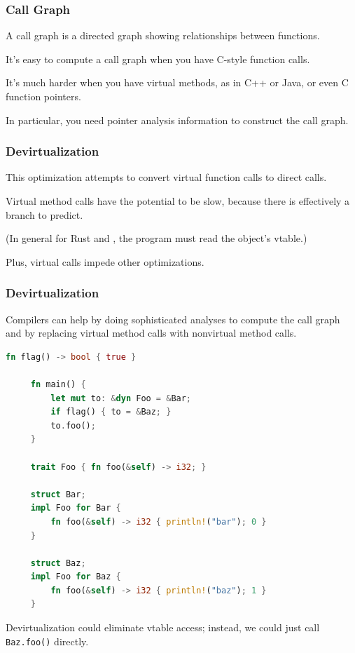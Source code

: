 \begin{frame}
\frametitle{Call Graph}


A \alert{call graph} is a directed graph showing relationships between
functions. 

It's easy to compute a call graph when you have C-style
function calls. 

It's much harder when you have virtual methods, as in
C++ or Java, or even C function pointers. 

In particular, you need pointer
analysis information to construct the call graph.


\end{frame}


\begin{frame}
\frametitle{Devirtualization}

This optimization attempts to convert virtual function calls to direct calls.  

Virtual method calls have the potential to be slow, because there is effectively a branch to predict. 

(In general for Rust and \CPP, the program must read the object's vtable.) 

Plus, virtual calls impede other optimizations.

\end{frame}

\begin{frame}[fragile]
\frametitle{Devirtualization}

Compilers can help by doing sophisticated analyses to compute the call graph and by replacing virtual method calls with nonvirtual method calls.  


 \begin{lstlisting}[language=Rust]
     fn flag() -> bool { true }

     fn main() {
         let mut to: &dyn Foo = &Bar;
         if flag() { to = &Baz; }
         to.foo();
     }

     trait Foo { fn foo(&self) -> i32; }

     struct Bar;
     impl Foo for Bar {
         fn foo(&self) -> i32 { println!("bar"); 0 }
     }

     struct Baz;
     impl Foo for Baz {
         fn foo(&self) -> i32 { println!("baz"); 1 }
     }
  \end{lstlisting}

Devirtualization could eliminate vtable access; instead, we could just call {\tt Baz.foo()} 
directly. 

\end{frame}

